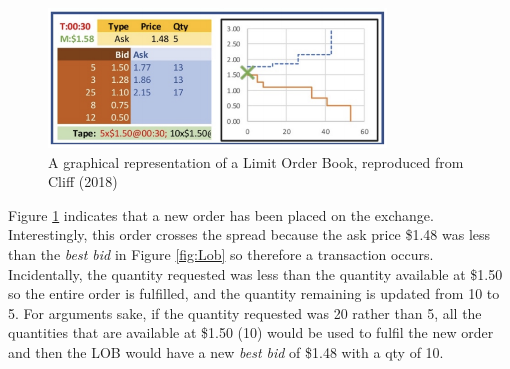 \documentclass[ %
                    author={Ashwinder Khurana},
                supervisor={Prof Dave Cliff},
                    degree={MEng},
                     title={The Deeply Reinforced Trader},
                  subtitle={},
                      type={enterprise},
                      year={2020} ]{dissertation}
\begin{document}
\begin{figure}[H]
	\centering
	\includegraphics[width=0.8\textwidth]{LOB-Postcross.png}
	\caption{A graphical representation of a Limit Order Book, reproduced from Cliff (2018)}
	\label{fig:LobPost}  
\end{figure}
\noindent
Figure \ref{fig:LobPost} indicates that a new order has been placed on the exchange. Interestingly, this order crosses the spread because the ask price \$1.48 was less than the \textit{best bid} in Figure \ref{fig:Lob} so therefore a transaction occurs. Incidentally, the quantity requested was less than the quantity available at \$1.50 so the entire order is fulfilled, and the quantity remaining is updated from 10 to 5. For arguments sake, if the quantity requested was 20 rather than 5, all the quantities that are available at \$1.50 (10) would be used to fulfil the new order and then the LOB would have a new \textit{best bid} of \$1.48 with a qty of 10. 
\vspace{1cm}
\end{document}
